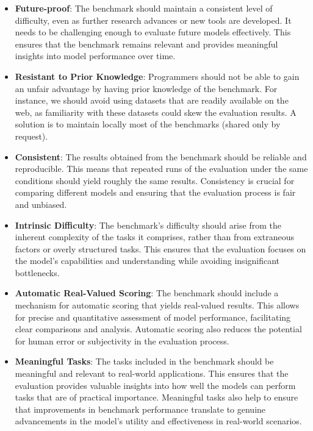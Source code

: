 \begin{itemize}
    \item \textbf{Future-proof}: The benchmark should maintain a consistent level of difficulty, even as further research advances or new tools are developed. It needs to be challenging enough to evaluate future models effectively. This ensures that the benchmark remains relevant and provides meaningful insights into model performance over time.
    
    \item \textbf{Resistant to Prior Knowledge}: Programmers should not be able to gain an unfair advantage by having prior knowledge of the benchmark. For instance, we should avoid using datasets that are readily available on the web, as familiarity with these datasets could skew the evaluation results. A solution is to maintain locally most of the benchmarks (shared only by request).
    
    \item \textbf{Consistent}: The results obtained from the benchmark should be reliable and reproducible. This means that repeated runs of the evaluation under the same conditions should yield roughly the same results. Consistency is crucial for comparing different models and ensuring that the evaluation process is fair and unbiased.
    
    \item \textbf{Intrinsic Difficulty}: The benchmark's difficulty should arise from the inherent complexity of the tasks it comprises, rather than from extraneous factors or overly structured tasks. This ensures that the evaluation focuses on the model's capabilities and understanding while avoiding insignificant bottlenecks.
    
    \item \textbf{Automatic Real-Valued Scoring}: The benchmark should include a mechanism for automatic scoring that yields real-valued results. This allows for precise and quantitative assessment of model performance, facilitating clear comparisons and analysis. Automatic scoring also reduces the potential for human error or subjectivity in the evaluation process.
    
    \item \textbf{Meaningful Tasks}: The tasks included in the benchmark should be meaningful and relevant to real-world applications. This ensures that the evaluation provides valuable insights into how well the models can perform tasks that are of practical importance. Meaningful tasks also help to ensure that improvements in benchmark performance translate to genuine advancements in the model's utility and effectiveness in real-world scenarios.
\end{itemize}

